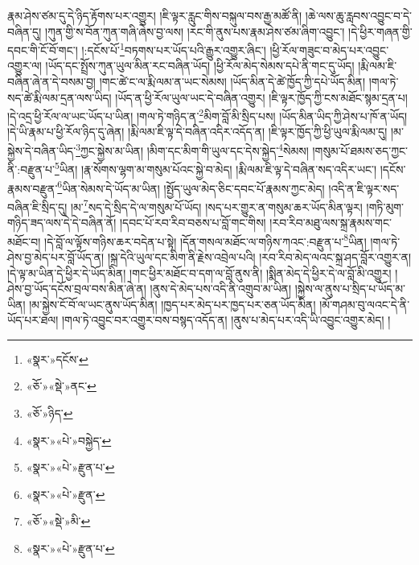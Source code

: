 རྣམ་ཤེས་ཙམ་དུ་དེ་ཉིད་རྟོགས་པར་འགྱུར། །ཇི་ལྟར་རླུང་གིས་བསྐུལ་བས་རྒྱ་མཚོ་ནི། །ཆེ་ལས་ཆུ་རླབས་འབྱུང་བ་དེ་བཞིན་དུ། །ཀུན་གྱི་ས་བོན་ཀུན་གཞི་ཞེས་བྱ་ལས། །རང་གི་ནུས་པས་རྣམ་ཤེས་ཙམ་ཞིག་འབྱུང་། །དེ་ཕྱིར་གཞན་གྱི་དབང་གི་ངོ་བོ་གང་། །:དངོས་པོ་\footnote{«སྣར་»དངོས་}བཏགས་པར་ཡོད་པའི་རྒྱུར་འགྱུར་ཞིང་། །ཕྱི་རོལ་གཟུང་བ་མེད་པར་འབྱུང་འགྱུར་ལ། །ཡོད་དང་སྤྲོས་ཀུན་ཡུལ་མིན་རང་བཞིན་ཡོད། །ཕྱི་རོལ་མེད་སེམས་དཔེ་ནི་གང་དུ་ཡོད། །རྨི་ལམ་ཇི་བཞིན་ཞེ་ན་དེ་བསམ་བྱ། །གང་ཚེ་ང་ལ་རྨི་ལམ་ན་ཡང་སེམས། །ཡོད་མིན་དེ་ཚེ་ཁྱོད་ཀྱི་དཔེ་ཡོད་མིན། །གལ་ཏེ་སད་ཚེ་རྨི་ལམ་དྲན་ལས་ཡིད། །ཡོད་ན་ཕྱི་རོལ་ཡུལ་ཡང་དེ་བཞིན་འགྱུར། །ཇི་ལྟར་ཁྱོད་ཀྱི་ངས་མཐོང་སྙམ་དྲན་པ། །དེ་འདྲ་ཕྱི་རོལ་ལ་ཡང་ཡོད་པ་ཡིན། །གལ་ཏེ་གཉིད་ན་\footnote{«ཅོ་»«སྡེ་»ནང་}མིག་བློ་མི་སྲིད་པས། །ཡོད་མིན་ཡིད་ཀྱི་ཤེས་པ་ཁོ་ན་ཡོད། །དེ་ཡི་རྣམ་པ་ཕྱི་རོལ་ཉིད་དུ་ཞེན། །རྨི་ལམ་ཇི་ལྟ་དེ་བཞིན་འདིར་འདོད་ན། །ཇི་ལྟར་ཁྱོད་ཀྱི་ཕྱི་ཡུལ་རྨི་ལམ་དུ། །མ་སྐྱེས་དེ་བཞིན་ཡིད་\footnote{«ཅོ་»ཉིད་}ཀྱང་སྐྱེས་མ་ཡིན། །མིག་དང་མིག་གི་ཡུལ་དང་དེས་སྐྱེད་\footnote{«སྣར་»«པེ་»བསྐྱེད་}སེམས། །གསུམ་པོ་ཐམས་ཅད་ཀྱང་ནི་:བརྫུན་པ་\footnote{«སྣར་»«པེ་»རྫུན་པ་}ཡིན། །རྣ་སོགས་ལྷག་མ་གསུམ་པོའང་སྐྱེ་བ་མེད། །རྨི་ལམ་ཇི་ལྟ་དེ་བཞིན་སད་འདིར་ཡང་། །དངོས་རྣམས་བརྫུན་\footnote{«སྣར་»«པེ་»རྫུན་}ཡིན་སེམས་དེ་ཡོད་མ་ཡིན། །སྤྱོད་ཡུལ་མེད་ཅིང་དབང་པོ་རྣམས་ཀྱང་མེད། །འདི་ན་ཇི་ལྟར་སད་བཞིན་ཇི་སྲིད་དུ། །མ་\footnote{«ཅོ་»«སྡེ་»མི་}སད་དེ་སྲིད་དེ་ལ་གསུམ་པོ་ཡོད། །སད་པར་གྱུར་ན་གསུམ་ཆར་ཡོད་མིན་ལྟར། །གཏི་མུག་གཉིད་ཟད་ལས་དེ་དེ་བཞིན་ནོ། །དབང་པོ་རབ་རིབ་བཅས་པ་བློ་གང་གིས། །རབ་རིབ་མཐུ་ལས་སྐྲ་རྣམས་གང་མཐོང་བ། །དེ་བློ་ལ་ལྟོས་གཉིས་ཆར་བདེན་པ་སྟེ། །དོན་གསལ་མཐོང་ལ་གཉིས་ཀའང་:བརྫུན་པ་\footnote{«སྣར་»«པེ་»རྫུན་པ་}ཡིན། །གལ་ཏེ་ཤེས་བྱ་མེད་པར་བློ་ཡོད་ན། །སྐྲ་དེའི་ཡུལ་དང་མིག་ནི་རྗེས་འབྲེལ་པའི། །རབ་རིབ་མེད་ལའང་སྐྲ་ཤད་བློར་འགྱུར་ན། །དེ་ལྟ་མ་ཡིན་དེ་ཕྱིར་དེ་ཡོད་མིན། །གང་ཕྱིར་མཐོང་བ་དག་ལ་བློ་ནུས་ནི། །སྨིན་མེད་དེ་ཕྱིར་དེ་ལ་བློ་མི་འགྱུར། །ཤེས་བྱ་ཡོད་དངོས་བྲལ་བས་མིན་ཞེ་ན། །ནུས་དེ་མེད་པས་འདི་ནི་འགྲུབ་མ་ཡིན། །སྐྱེས་ལ་ནུས་པ་སྲིད་པ་ཡོད་མ་ཡིན། །མ་སྐྱེས་ངོ་བོ་ལ་ཡང་ནུས་ཡོད་མིན། །ཁྱད་པར་མེད་པར་ཁྱད་པར་ཅན་ཡོད་མིན། །མོ་གཤམ་བུ་ལའང་དེ་ནི་ཡོད་པར་ཐལ། །གལ་ཏེ་འབྱུང་བར་འགྱུར་བས་བསྙད་འདོད་ན། །ནུས་པ་མེད་པར་འདི་ཡི་འབྱུང་འགྱུར་མེད། །
